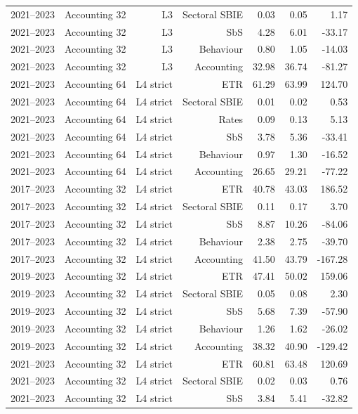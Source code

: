 {\begin{longtable}{@{}lrrrrrr@{}}
2021–2023 & Accounting 32 & L3 & Sectoral SBIE &  0.03 &  0.05 &    1.17 \\
2021–2023 & Accounting 32 & L3 & SbS &  4.28 &  6.01 &  -33.17 \\
2021–2023 & Accounting 32 & L3 & Behaviour &  0.80 &  1.05 &  -14.03 \\
2021–2023 & Accounting 32 & L3 & Accounting & 32.98 & 36.74 &  -81.27 \\
2021–2023 & Accounting 64 & L4 strict & ETR & 61.29 & 63.99 &  124.70 \\
2021–2023 & Accounting 64 & L4 strict & Sectoral SBIE &  0.01 &  0.02 &    0.53 \\
2021–2023 & Accounting 64 & L4 strict & Rates &  0.09 &  0.13 &    5.13 \\
2021–2023 & Accounting 64 & L4 strict & SbS &  3.78 &  5.36 &  -33.41 \\
2021–2023 & Accounting 64 & L4 strict & Behaviour &  0.97 &  1.30 &  -16.52 \\
2021–2023 & Accounting 64 & L4 strict & Accounting & 26.65 & 29.21 &  -77.22 \\
2017–2023 & Accounting 32 & L4 strict & ETR & 40.78 & 43.03 &  186.52 \\
2017–2023 & Accounting 32 & L4 strict & Sectoral SBIE &  0.11 &  0.17 &    3.70 \\
2017–2023 & Accounting 32 & L4 strict & SbS &  8.87 & 10.26 &  -84.06 \\
2017–2023 & Accounting 32 & L4 strict & Behaviour &  2.38 &  2.75 &  -39.70 \\
2017–2023 & Accounting 32 & L4 strict & Accounting & 41.50 & 43.79 & -167.28 \\
2019–2023 & Accounting 32 & L4 strict & ETR & 47.41 & 50.02 &  159.06 \\
2019–2023 & Accounting 32 & L4 strict & Sectoral SBIE &  0.05 &  0.08 &    2.30 \\
2019–2023 & Accounting 32 & L4 strict & SbS &  5.68 &  7.39 &  -57.90 \\
2019–2023 & Accounting 32 & L4 strict & Behaviour &  1.26 &  1.62 &  -26.02 \\
2019–2023 & Accounting 32 & L4 strict & Accounting & 38.32 & 40.90 & -129.42 \\
2021–2023 & Accounting 32 & L4 strict & ETR & 60.81 & 63.48 &  120.69 \\
2021–2023 & Accounting 32 & L4 strict & Sectoral SBIE &  0.02 &  0.03 &    0.76 \\
2021–2023 & Accounting 32 & L4 strict & SbS &  3.84 &  5.41 &  -32.82 \\

\end{longtable}}
